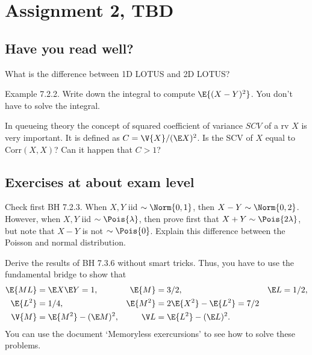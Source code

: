 \documentclass[assignments]{subfiles}
\begin{document}
\section{Assignment 2, TBD}


\subsection{Have you read well?}


\begin{exercise}
What is the difference between 1D LOTUS and 2D LOTUS?
\end{exercise}

\begin{exercise}
Example 7.2.2. Write down the integral to compute $\E{(X-Y)^{2}}$. You don't have to solve the integral.
\end{exercise}

\begin{exercise}
In queueing theory  the concept of squared coefficient of variance $SCV$ of a rv $X$ is very important. It is defined as $C = \V{X}/(\E X)^{2}$. Is the SCV of $X$ equal to $\text{Corr}(X,X)$? Can it happen that $C>1$?
\end{exercise}


\subsection{Exercises at about exam level}
\label{sec:exercises-at-about}


\begin{exercise}
Check first BH 7.2.3.
When $X, Y$ iid $\sim \Norm{0, 1}$, then $X-Y\sim\Norm{0,2}$.
However, when $X, Y$ iid $\sim \Pois{\lambda}$, then prove first that $X+Y\sim \Pois{2\lambda}$, but note that $X-Y$ is not $\sim\Pois{0}$.
Explain this difference between the Poisson and normal distribution.
\end{exercise}


\begin{exercise}
Derive the results of BH 7.3.6 without smart tricks. Thus, you have to use the fundamental bridge to show that 
\begin{align*}
\E{M L} &= \E X \E Y = 1, & \E{M} &= 3/2, & \E L &= 1/2, \\
\E{L^{2}} &=  1/4, & \E{M^{2}} &= 2\E{X^{2}} - \E{L^{2}} = 7/2 \\ 
\V{M}&=\E{M^2} - (\E M)^{2}, & \V L &= \E{L^2}-(\E L)^2.
\end{align*}
You can use the document `Memoryless exercursions' to see how to solve these problems. 
\end{exercise}
\end{document}
